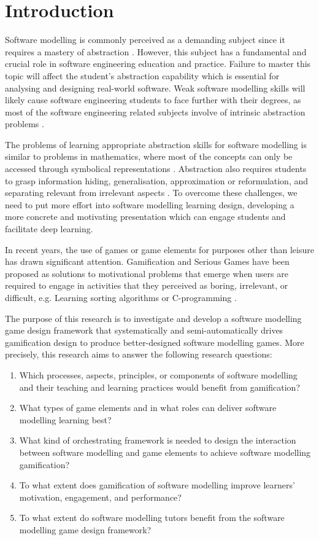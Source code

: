 \documentclass[runningheads,a4paper]{llncs}
\begin{document}
\section{Introduction}
Software modelling is commonly perceived as a demanding subject since it requires a mastery of abstraction \cite{Borstler2012}. However, this subject has a fundamental and crucial role in software engineering education and practice. Failure to master this topic will affect the student’s abstraction capability which is essential for analysing and designing real-world software. Weak software modelling skills will likely cause software engineering students to face further with their degrees, as most of the software engineering related subjects involve of intrinsic abstraction problems \cite{Kramer2007}. 

The problems of learning appropriate abstraction skills for software modelling is similar to problems in mathematics, where most of the concepts can only be accessed through symbolical representations \cite{Duval2006}. Abstraction also requires students to grasp information hiding, generalisation, approximation or reformulation, and separating relevant from irrelevant aspects \cite{Saitta2013}. To overcome these challenges, we need to put more effort into software modelling learning design, developing a more concrete and motivating presentation which can engage students and facilitate deep learning.

In recent years, the use of games or game elements for purposes other than leisure has drawn significant attention. Gamification \cite{deterding2011game} and Serious Games \cite{Michael2005} have been proposed as solutions to motivational problems that emerge when users are required to engage in activities that they perceived as boring, irrelevant, or difficult, e.g. Learning sorting algorithms \cite{Yohannis2015} or C-programming \cite{Ibanez2014}.

The purpose of this research is to investigate and develop a software modelling game design framework that systematically and semi-automatically drives gamification design to produce better-designed software modelling games. More precisely, this research aims to answer the following research questions:
\begin{enumerate}
\item Which processes, aspects, principles, or components of software modelling and their teaching and learning practices would benefit from gamification?
\item What types of game elements and in what roles can deliver software modelling learning best? 
\item What kind of orchestrating framework is needed to design the interaction between software modelling and game elements to achieve software modelling gamification?
\item To what extent does gamification of software modelling improve learners' motivation, engagement, and performance?
\item To what extent do software modelling tutors benefit from the software modelling game design framework?
\end{enumerate}
\end{document}
